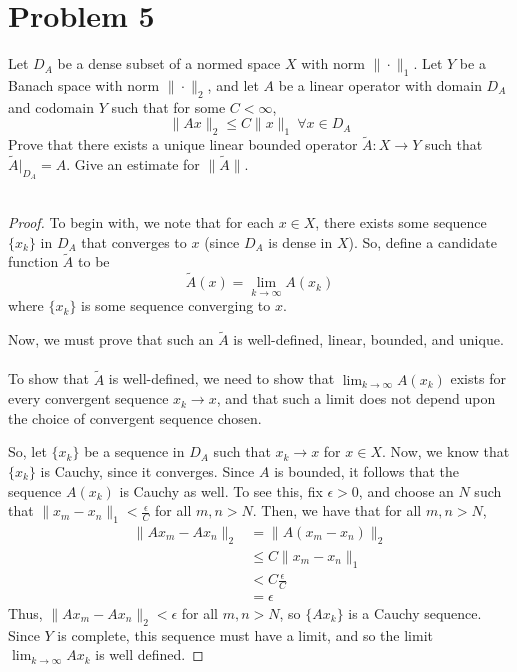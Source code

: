 \documentclass[fontsize=11pt]{scrartcl} %
\numberwithin{equation}{section} %
\numberwithin{figure}{section} %
\numberwithin{table}{section} %
\begin{document}
\newpage

\section*{Problem 5}
Let $D_A$ be a dense subset of a normed space $X$ with norm $\|\cdot\|_1$. Let
$Y$ be a Banach space with norm $\|\cdot\|_2$, and let $A$ be a linear operator
with domain $D_A$ and codomain $Y$ such that for some $C<\infty$,
\[
    \|Ax\|_2 \leq C\|x\|_1\ \forall x\in D_A 
\]
Prove that there exists a unique linear bounded operator $\tilde{A}:X\to Y$ such
that $\tilde{A}|_{D_A} = A$. Give an estimate for $\|\tilde{A}\|$.
\\
\\
\begin{proof}
    To begin with, we note that for each $x\in X$, there exists
    some sequence $\{x_k\}$ in $D_A$ that converges to $x$ (since $D_A$ is dense
    in $X$). So, define a candidate function $\tilde{A}$ to be
    \[
        \tilde{A}(x) = \lim_{k\to\infty}A(x_k)
    \]
    where $\{x_k\}$ is some sequence converging to $x$.

    Now, we must prove that such an $\tilde{A}$ is well-defined, linear,
    bounded, and unique.
    \\
    \\
    To show that $\tilde{A}$ is well-defined, we need to show that
    $\lim_{k\to\infty}A(x_k)$ exists for every convergent sequence $x_k\to x$,
    and that such a limit does not depend upon the choice of convergent sequence
    chosen.

    So, let $\{x_k\}$ be a sequence in $D_A$ such that $x_k\to x$ for $x\in X$.
    Now, we know that $\{x_k\}$ is Cauchy, since it converges. Since $A$ is
    bounded, it follows that the sequence $A(x_k)$ is Cauchy as well. To see
    this, fix $\epsilon>0$, and choose an $N$ such that
    $\|x_m-x_n\|_1<\frac{\epsilon}{C}$ for all $m,n >N$. Then, we have that
    for all $m,n >N$,
    \[
        \begin{aligned}
            \|Ax_m -Ax_n\|_2 &= \|A(x_m-x_n)\|_2\\
                            &\leq C\|x_m-x_n\|_1\\
                            &<C\frac{\epsilon}{C}\\
                            &=\epsilon
        \end{aligned}
    \]
    Thus, $\|Ax_m-Ax_n\|_2 < \epsilon$ for all $m,n>N$, so $\{Ax_k\}$ is a Cauchy
    sequence. Since $Y$ is complete, this sequence must have a limit, and so the
    limit $\lim_{k\to\infty}Ax_k$ is well defined.


\end{proof}
\end{document}
